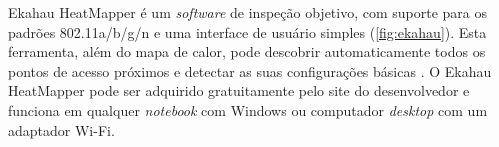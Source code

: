 \begin{figure}[H]
	\centering
\end{figure}

\label{subsubsubsec:ekahau}

Ekahau HeatMapper é um \textit{software} de inspeção objetivo, com suporte para os padrões 802.11a/b/g/n e uma interface de usuário simples (\autoref{fig:ekahau}). Esta ferramenta, além do mapa de calor, pode descobrir automaticamente todos os pontos de acesso próximos e detectar as suas configurações básicas \cite{Ekahau2019}. O Ekahau HeatMapper pode ser adquirido gratuitamente pelo site do desenvolvedor e funciona em qualquer \textit{notebook} com Windows ou computador \textit{desktop} com um adaptador Wi-Fi.

\begin{figure}[H]
	\centering
\end{figure}

